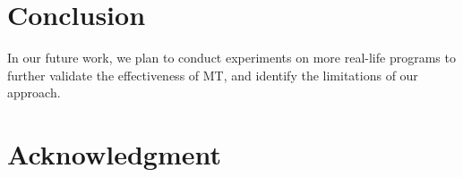 \documentclass[conference]{IEEEtran}
\theoremstyle{remark}
\begin{document}
\section{Conclusion}
\label{section:conclusion}


In our future work, we plan to conduct experiments on more real-life programs to further validate the effectiveness of MT, and identify the limitations of our approach.

\section*{Acknowledgment}


\newcommand{\BIBdecl}{\setlength{\itemsep}{0.2 em}}



\end{document}
